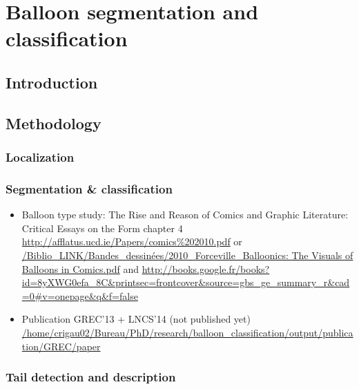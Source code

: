 \chapter{Balloon segmentation and classification}
\label{chap:balloon_segmentation_and_classification}
\graphicspath{{./chapters/6-be/figs/}}

\section{Introduction}
\label{sec:be:introduction}


\section{Methodology}
\label{sec:be:methodology}

\subsection{Localization} %
\label{sub:be:localization}


\subsection{Segmentation \& classification} %
\label{sub:be:segmentation}
\begin{itemize}
	\item Balloon type study: The Rise and Reason of Comics and Graphic Literature: Critical Essays on the Form chapter 4 \url{http://afflatus.ucd.ie/Papers/comics%202010.pdf} or \url{/Biblio_LINK/Bandes_dessinées/2010_Forceville_Balloonics: The Visuals of Balloons in Comics.pdf} and \url{http://books.google.fr/books?id=8yXWG0efa_8C&printsec=frontcover&source=gbs_ge_summary_r&cad=0#v=onepage&q&f=false}
	\item Publication GREC'13 + LNCS'14 (not published yet) \url{/home/crigau02/Bureau/PhD/research/balloon_classification/output/publication/GREC/paper}
\end{itemize}


\subsection{Tail detection and description} %
\label{sub:be:tail_detection_and_description}

